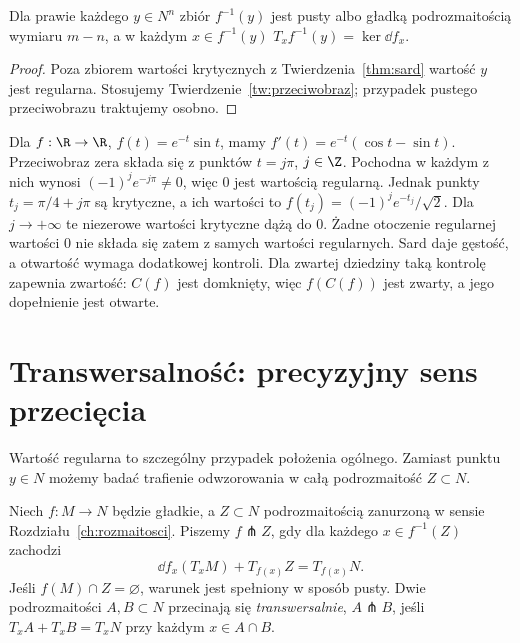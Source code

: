 \begin{wniosek}
\label{cor:sard-poziomica}
Dla prawie każdego $y\in N^n$ zbiór
$f^{-1}(y)$ jest pusty albo gładką
podrozmaitością wymiaru $m-n$, a w każdym
$x\in f^{-1}(y)$
$T_xf^{-1}(y)=\ker\dd f_x$.
\end{wniosek}
\begin{proof}
Poza zbiorem wartości krytycznych z
Twierdzenia~\ref{thm:sard} wartość $y$
jest regularna. Stosujemy
Twierdzenie~\ref{tw:przeciwobraz}; przypadek
pustego przeciwobrazu traktujemy osobno.
\end{proof}

\begin{przyklad}
\label{prz:sard-regularne-nieotwarte-19}
Dla $f:\R\to\R$, $f(t)=e^{-t}\sin t$, mamy
$f'(t)=e^{-t}(\cos t-\sin t)$.
Przeciwobraz zera składa się z punktów $t=j\pi$, $j\in\Z$.
Pochodna w każdym z nich wynosi $(-1)^je^{-j\pi}\ne0$,
więc $0$ jest wartością regularną.
Jednak punkty $t_j=\pi/4+j\pi$ są krytyczne, a ich wartości
to $f(t_j)=(-1)^je^{-t_j}/\sqrt2$.
Dla $j\to+\infty$ te niezerowe wartości krytyczne dążą do $0$.
Żadne otoczenie regularnej wartości $0$ nie składa się zatem
z samych wartości regularnych.
Sard daje gęstość, a otwartość wymaga dodatkowej kontroli.
Dla zwartej dziedziny taką kontrolę zapewnia zwartość:
$C(f)$ jest domknięty, więc $f(C(f))$ jest zwarty,
a jego dopełnienie jest otwarte.
\end{przyklad}

\section{Transwersalność: precyzyjny sens przecięcia}
\label{sec:transwersalnosc}

Wartość regularna to szczególny przypadek
położenia ogólnego. Zamiast punktu $y\in N$
możemy badać trafienie odwzorowania w całą
podrozmaitość $Z\subset N$.

\begin{definicja}
\label{def:transwersalnosc}
Niech $f:M\to N$ będzie gładkie, a
$Z\subset N$ podrozmaitością zanurzoną w sensie
Rozdziału~\ref{ch:rozmaitosci}. Piszemy
$f\pitchfork Z$, gdy dla każdego
$x\in f^{-1}(Z)$ zachodzi
\begin{equation}\label{eq:transwersalnosc}
 \dd f_x(T_xM)+T_{f(x)}Z=T_{f(x)}N.
\end{equation}
Jeśli $f(M)\cap Z=\varnothing$, warunek jest spełniony
w sposób pusty. Dwie podrozmaitości $A,B\subset N$
przecinają się \emph{transwersalnie},
$A\pitchfork B$, jeśli
$T_xA+T_xB=T_xN$ przy każdym $x\in A\cap B$.
\end{definicja}


